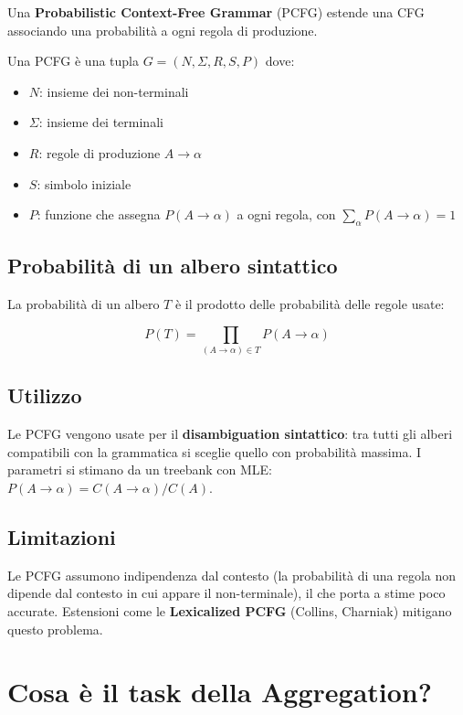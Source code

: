 \documentclass[12pt,a4paper]{article}
\begin{document}
Una \textbf{Probabilistic Context-Free Grammar} (PCFG) estende una CFG associando una probabilità a ogni regola di produzione.

\begin{defbox}
Una PCFG è una tupla $G = (N, \Sigma, R, S, P)$ dove:
\begin{itemize}[leftmargin=1.5em]
  \item $N$: insieme dei non-terminali
  \item $\Sigma$: insieme dei terminali
  \item $R$: regole di produzione $A \to \alpha$
  \item $S$: simbolo iniziale
  \item $P$: funzione che assegna $P(A \to \alpha)$ a ogni regola, con $\sum_\alpha P(A \to \alpha) = 1$
\end{itemize}
\end{defbox}

\subsection{Probabilità di un albero sintattico}
La probabilità di un albero $T$ è il prodotto delle probabilità delle regole usate:
\begin{formulabox}
\[
P(T) = \prod_{(A \to \alpha) \in T} P(A \to \alpha)
\]
\end{formulabox}

\subsection{Utilizzo}
Le PCFG vengono usate per il \textbf{disambiguation sintattico}: tra tutti gli alberi compatibili con la grammatica si sceglie quello con probabilità massima. I parametri si stimano da un treebank con MLE: $P(A \to \alpha) = C(A \to \alpha) / C(A)$.

\subsection{Limitazioni}
Le PCFG assumono indipendenza dal contesto (la probabilità di una regola non dipende dal contesto in cui appare il non-terminale), il che porta a stime poco accurate. Estensioni come le \textbf{Lexicalized PCFG} (Collins, Charniak) mitigano questo problema.

\section{Cosa è il task della Aggregation?}
\end{document}
